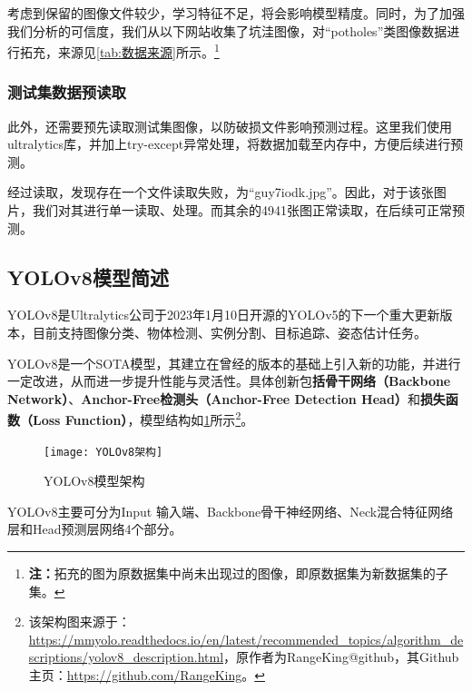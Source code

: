 \documentclass{MathorCupmodeling}
\begin{document}
	考虑到保留的图像文件较少，学习特征不足，将会影响模型精度。同时，为了加强我们分析的可信度，我们从以下网站收集了坑洼图像，对“potholes”类图像数据进行拓充，来源见\textcolor{blue}{\cref{tab:数据来源}}所示。\textcolor{blue}{\footnote{\textbf{注：}拓充的图为原数据集中尚未出现过的图像，即原数据集为新数据集的子集。}}
	\begin{table}[htbp]
		\centering
		\caption{拓充数据来源}
		\label{tab:数据来源}
	  \end{table}
	\subsubsection{测试集数据预读取}
	此外，还需要预先读取测试集图像，以防破损文件影响预测过程。这里我们使用ultralytics库，并加上try-except异常处理，将数据加载至内存中，方便后续进行预测。
	
	经过读取，发现存在一个文件读取失败，为“guy7iodk.jpg”。因此，对于该张图片，我们对其进行单一读取、处理。而其余的4941张图正常读取，在后续可正常预测。
	
	\subsection{YOLOv8模型简述}

	YOLOv8是Ultralytics公司于2023年1月10日开源的YOLOv5的下一个重大更新版本，目前支持图像分类、物体检测、实例分割、目标追踪、姿态估计任务\textcolor{blue}{\cite{YOLO任务}}。

	YOLOv8是一个SOTA模型，其建立在曾经的版本的基础上引入新的功能，并进行一定改进，从而进一步提升性能与灵活性。具体创新包\textbf{括骨干网络（Backbone Network）}、\textbf{Anchor-Free检测头（Anchor-Free Detection Head）}和\textbf{损失函数（Loss Function）}\textcolor{blue}{\cite{YOLO架构}}，模型结构如\textcolor{blue}{\cref{fig:YOLO架构}}所示\textcolor{blue}{\footnote{该架构图来源于：\url{https://mmyolo.readthedocs.io/en/latest/recommended_topics/algorithm_descriptions/yolov8_description.html}，原作者为RangeKing@github，其Github主页：\url{https://github.com/RangeKing}。}}。
	\begin{figure}[H]
		\centering
		\texttt{[image: YOLOv8架构]}
		\caption{YOLOv8模型架构}
		\label{fig:YOLO架构}
	\end{figure}
	YOLOv8主要可分为Input 输入端、Backbone骨干神经网络、Neck混合特征网络层和Head预测层网络4个部分\textcolor{blue}{\cite{YOLOv8简述}}。
	
\end{document}
